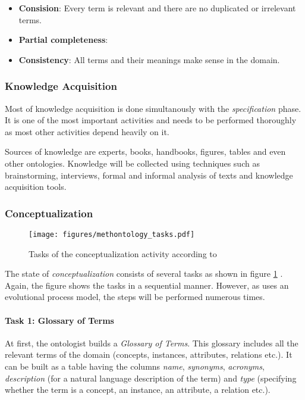 \begin{itemize}
  \item \textbf{Consision}: Every term is relevant and there are no duplicated or irrelevant terms.
  \item \textbf{Partial completeness}: %
  \item \textbf{Consistency}: All terms and their meanings make sense in the domain.
\end{itemize}

\subsubsection{Knowledge Acquisition}

Most of knowledge acquisition is done simultanously with the \emph{specification} phase. It is one of the most important activities and needs to be performed thoroughly as most other activities depend heavily on it.

Sources of knowledge are experts, books, handbooks, figures, tables and even other ontologies. Knowledge will be collected using techniques such as brainstorming, interviews, formal and informal analysis of texts and knowledge acquisition tools.

\subsubsection{Conceptualization}

\begin{figure}
  \texttt{[image: figures/methontology\_tasks.pdf]}
  \caption{Tasks of the conceptualization activity according to \methontology \cite{MethontologyLegal}}
  \label{fig:methontology2}
\end{figure}

The state of \emph{conceptualization} consists of several tasks as shown in figure \ref{fig:methontology2} \cite{MethontologyLegal}. Again, the figure shows the tasks in a sequential manner. However, as \methontology uses an evolutional process model, the steps will be performed numerous times.

\paragraph{Task 1: Glossary of Terms}

At first, the ontologist builds a \emph{Glossary of Terms}. This glossary includes all the relevant terms of the domain (concepts, instances, attributes, relations etc.). It can be built as a table having the columns \emph{name}, \emph{synonyms}, \emph{acronyms}, \emph{description} (for a natural language description of the term) and \emph{type} (specifying whether the term is a concept, an instance, an attribute, a relation etc.).

